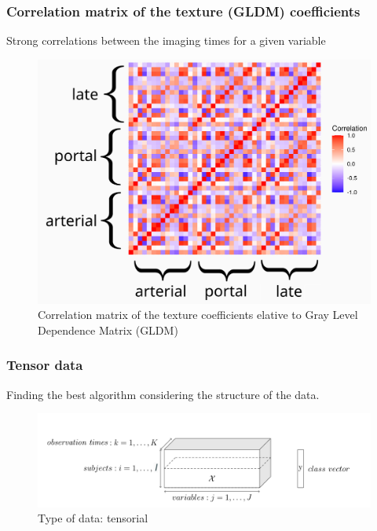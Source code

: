\documentclass{beamer}
\begin{document}
\begin{frame}
    \frametitle{Correlation matrix of the texture (GLDM) coefficients}
    Strong correlations between the imaging times for a given variable
    \begin{figure}
        \centering
        \includegraphics[scale = 0.1]{images/correlation.png}
        \caption{Correlation matrix of the texture coefficients elative to Gray Level Dependence Matrix (GLDM)}
    \end{figure}

\end{frame}

\begin{frame}
    \frametitle{Tensor data}
    Finding the best algorithm considering the structure of the data.
    \begin{figure}
        \centering
        \includegraphics[scale = 0.3]{images/tensor.png}
        \caption{Type of data: tensorial}
    \end{figure}


\end{frame}
\end{document}
